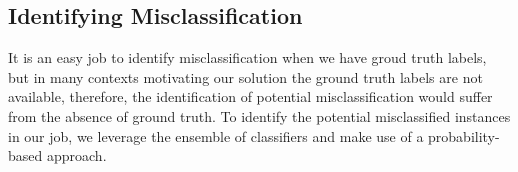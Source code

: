 \subsection{Identifying Misclassification}
It is an easy job to identify misclassification when we have groud truth labels, but in many contexts motivating our solution the ground truth labels are not available, therefore, the identification of potential misclassification would suffer from the absence of ground truth. To identify the potential misclassified instances in our job, we leverage the ensemble of classifiers and make use of a probability-based approach.
